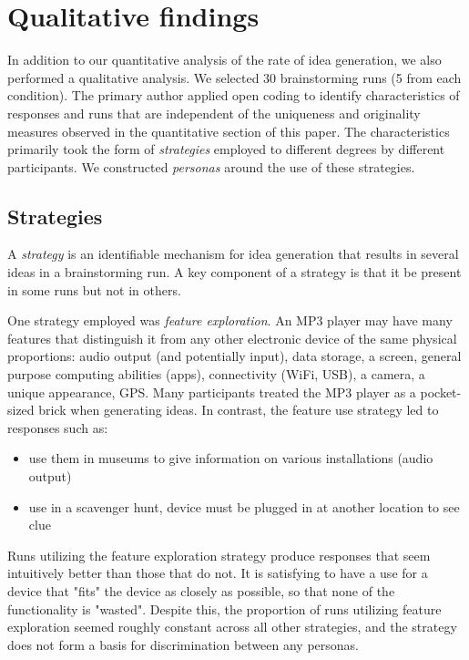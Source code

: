 \section{Qualitative findings}

In addition to our quantitative analysis of the rate of idea generation, we also performed a qualitative analysis.
We selected 30 brainstorming runs (5 from each condition). The primary author applied open coding to identify characteristics of responses and runs that are independent of the uniqueness and originality measures observed in the quantitative section of this paper.
The characteristics primarily took the form of \emph{strategies} employed to different degrees by different participants.
We constructed \emph{personas} around the use of these strategies.

\subsection{Strategies}

A \emph{strategy} is an identifiable mechanism for idea generation that results in several ideas in a brainstorming run. A key component of a strategy is that it be present in some runs but not in others.

One strategy employed was \emph{feature exploration}. An MP3 player may have many features that distinguish it from any other electronic device of the same physical proportions: audio output (and potentially input), data storage, a screen, general purpose computing abilities (apps), connectivity (WiFi, USB), a camera, a unique appearance, GPS.
Many participants treated the MP3 player as a pocket-sized brick when generating ideas.
In contrast, the feature use strategy led to responses such as:

\begin{itemize}
    \item use them in museums to give information on various installations (audio output)
    \item use in a scavenger hunt, device must be plugged in at another location to see clue
\end{itemize}

Runs utilizing the feature exploration strategy produce responses that seem intuitively better than those that do not. It is satisfying to have a use for a device that "fits" the device as closely as possible, so that none of the functionality is "wasted". Despite this, the proportion of runs utilizing feature exploration seemed roughly constant across all other strategies, and the strategy does not form a basis for discrimination between any personas.

